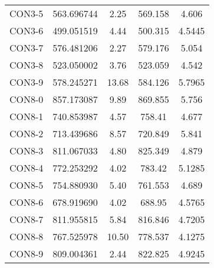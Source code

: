 \begin{table}[ht]
\begin{tabular}{c c c c c}
CON3-5 & 563.696744 & 2.25 & 569.158 & 4.606 \\
CON3-6 & 499.051519 & 4.44 & 500.315 & 4.5445 \\
CON3-7 & 576.481206 & 2.27 & 579.176 & 5.054 \\
CON3-8 & 523.050002 & 3.76 & 523.059 & 4.542 \\
CON3-9 & 578.245271 & 13.68 & 584.126 & 5.7965 \\
CON8-0 & 857.173087 & 9.89 & 869.855 & 5.756 \\
CON8-1 & 740.853987 & 4.57 & 758.41 & 4.677 \\
CON8-2 & 713.439686 & 8.57 & 720.849 & 5.841 \\
CON8-3 & 811.067033 & 4.80 & 825.349 & 4.879 \\
CON8-4 & 772.253292 & 4.02 & 783.42 & 5.1285 \\
CON8-5 & 754.880930 & 5.40 & 761.553 & 4.689 \\
CON8-6 & 678.919690 & 4.02 & 688.95 & 4.5765 \\
CON8-7 & 811.955815 & 5.84 & 816.846 & 4.7205 \\
CON8-8 & 767.525978 & 10.50 & 778.537 & 4.1275 \\
CON8-9 & 809.004361 & 2.44 & 822.825 & 4.9245 \\
[1ex]\hline
\end{tabular}
\label{table:nonlin}
\end{table} \clearpage
